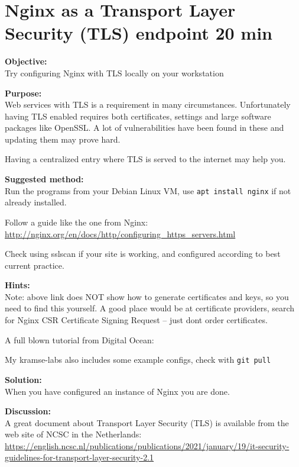 \documentclass[a4paper,11pt,notitlepage]{report}
\begin{document}
\chapter{Nginx as a Transport Layer Security (TLS) endpoint 20 min}
\label{ex:nginx-tls}

{\bf Objective:}\\
Try configuring Nginx with TLS locally on your workstation


{\bf Purpose:}\\
Web services with TLS is a requirement in many circumstances. Unfortunately having TLS enabled requires both certificates, settings and large software packages like OpenSSL. A lot of vulnerabilities have been found in these and updating them may prove hard.

Having a centralized entry where TLS is served to the internet may help you.

{\bf Suggested method:}\\
Run the programs from your Debian Linux VM, use \verb+apt install nginx+ if not already installed.

Follow a guide like the one from Nginx:\\
\url{http://nginx.org/en/docs/http/configuring_https_servers.html}

Check using sslscan if your site is working, and configured according to best current practice.

{\bf Hints:}\\
Note: above link does NOT show how to generate certificates and keys, so you need to find this yourself. A good place would be at certificate providers, search for Nginx CSR Certificate Signing Request -- just dont order certificates.

A full blown tutorial from Digital Ocean:\\{\scriptsize
{}}

My kramse-labs also includes some example configs, check with \verb+git pull+

{\bf Solution:}\\
When you have configured an instance of Nginx you are done.

{\bf Discussion:}\\
A great document about Transport Layer Security (TLS) is available from the web site of NCSC in the Netherlands:\\
{\scriptsize\url{https://english.ncsc.nl/publications/publications/2021/january/19/it-security-guidelines-for-transport-layer-security-2.1}}
\end{document}
